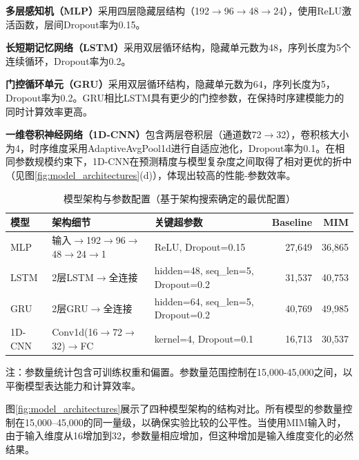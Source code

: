 \documentclass[10pt,a4paper]{ctexart}
\begin{document}
\textbf{多层感知机（MLP）}采用四层隐藏层结构（192$\rightarrow$96$\rightarrow$48$\rightarrow$24），使用ReLU激活函数，层间Dropout率为0.15。

\textbf{长短期记忆网络（LSTM）}采用双层循环结构，隐藏单元数为48，序列长度为5个连续循环，Dropout率为0.2。

\textbf{门控循环单元（GRU）}采用双层循环结构，隐藏单元数为64，序列长度为5，Dropout率为0.2。GRU相比LSTM具有更少的门控参数，在保持时序建模能力的同时计算效率更高。

\textbf{一维卷积神经网络（1D-CNN）}包含两层卷积层（通道数72$\rightarrow$32），卷积核大小为4，时序维度采用AdaptiveAvgPool1d进行自适应池化，Dropout率为0.1。在相同参数规模约束下，1D-CNN在预测精度与模型复杂度之间取得了相对更优的折中（见图\ref{fig:model_architectures}(d)），体现出较高的性能-参数效率。

\begin{table}[H]
\centering
\caption{模型架构与参数配置（基于架构搜索确定的最优配置）}
\label{tab:model_config}
\begin{threeparttable}
\begin{tabular}{@{}llp{5cm}rr@{}}
\toprule
\textbf{模型} & \textbf{架构细节} & \textbf{关键超参数} & \textbf{Baseline} & \textbf{MIM} \\
\midrule
MLP & 输入$\rightarrow$192$\rightarrow$96$\rightarrow$48$\rightarrow$24$\rightarrow$1 & ReLU, Dropout=0.15 & 27,649 & 36,865 \\
LSTM & 2层LSTM$\rightarrow$全连接 & hidden=48, seq\_len=5, Dropout=0.2 & 31,537 & 40,753 \\
GRU & 2层GRU$\rightarrow$全连接 & hidden=64, seq\_len=5, Dropout=0.2 & 40,769 & 49,985 \\
1D-CNN & Conv1d(16$\rightarrow$72$\rightarrow$32)$\rightarrow$FC & kernel=4, Dropout=0.1 & 16,713 & 30,537 \\
\bottomrule
\end{tabular}
\begin{tablenotes}
    \item 注：参数量统计包含可训练权重和偏置。参数量范围控制在15,000-45,000之间，以平衡模型表达能力和计算效率。
\end{tablenotes}
\end{threeparttable}
\end{table}

图\ref{fig:model_architectures}展示了四种模型架构的结构对比。所有模型的参数量控制在15,000--45,000的同一量级，以确保实验比较的公平性。当使用MIM输入时，由于输入维度从16增加到32，参数量相应增加，但这种增加是输入维度变化的必然结果。
\end{document}
